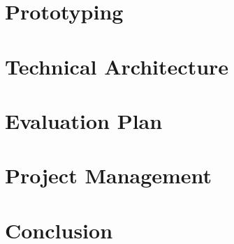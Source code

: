 \documentclass[12pt]{report}
\begin{document}
\chapter{Prototyping}


\chapter{Technical Architecture}


\chapter{Evaluation Plan}


\chapter{Project Management}


\chapter{Conclusion}


\appendix
\begin{appendices}

\end{appendices}

%


\end{document}
